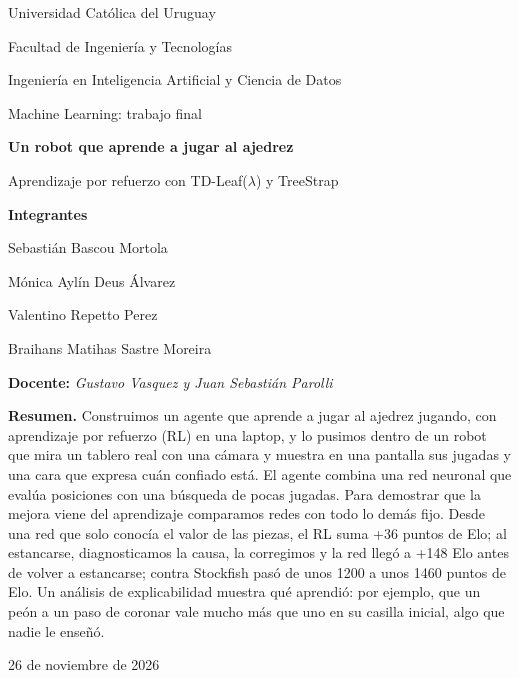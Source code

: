 \documentclass[11pt,a4paper]{article}
\begin{document}
\begin{titlepage}
\centering
{\large Universidad Católica del Uruguay\par}
{\large Facultad de Ingeniería y Tecnologías\par}
\vspace{0.4cm}
{Ingeniería en Inteligencia Artificial y Ciencia de Datos\par}
{Machine Learning: trabajo final\par}
\vspace{2.5cm}
{\LARGE\bfseries Un robot que aprende a jugar al ajedrez\par}
\vspace{0.3cm}
{\Large Aprendizaje por refuerzo con TD-Leaf($\lambda$) y TreeStrap\par}
\vspace{2.5cm}
{\large\textbf{Integrantes}\par}
\vspace{0.2cm}
Sebastián Bascou Mortola\par
Mónica Aylín Deus Álvarez\par
Valentino Repetto Perez\par
Braihans Matihas Sastre Moreira\par
\vspace{1.5cm}
{\large\textbf{Docente:} \textit{Gustavo Vasquez y Juan Sebastián Parolli}\par}
\vfill
\begin{minipage}{0.9\textwidth}
\small
\textbf{Resumen.} Construimos un agente que aprende a jugar al ajedrez
jugando, con aprendizaje por refuerzo (RL) en una laptop, y lo pusimos
dentro de un robot que mira un tablero real con una cámara y muestra en una
pantalla sus jugadas y una cara que expresa cuán confiado está. El agente
combina una red neuronal que evalúa posiciones con una búsqueda de pocas
jugadas. Para demostrar que la mejora viene del aprendizaje comparamos
redes con todo lo demás fijo. Desde una red que solo conocía el valor de
las piezas, el RL suma +36 puntos de Elo; al estancarse, diagnosticamos la
causa, la corregimos y la red llegó a +148 Elo antes de volver a
estancarse; contra Stockfish pasó de unos 1200 a unos 1460 puntos de Elo. Un análisis de explicabilidad muestra qué aprendió: por
ejemplo, que un peón a un paso de coronar vale mucho más que uno en su
casilla inicial, algo que nadie le enseñó.
\end{minipage}
\vspace{1cm}

{\large 26 de noviembre de 2026\par}
\end{titlepage}
\end{document}
